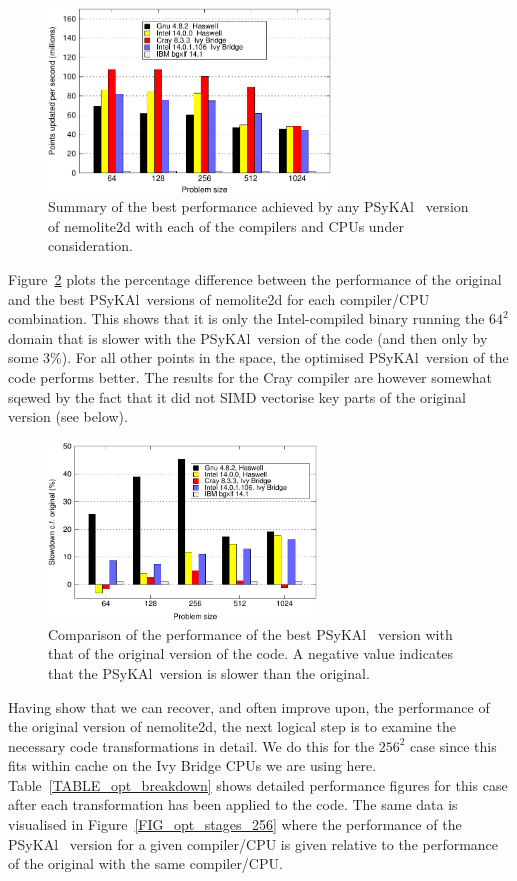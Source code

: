 \documentclass[journal]{IEEEtran}
\newcommand{\psykal}{{PS}y{KA}l\ }
\begin{document}
\begin{figure}[!t]
\centering
\includegraphics[width=7.5cm]{best_psykal_summary}
\caption{Summary of the best performance achieved by any \psykal 
version of nemolite2d with each of the compilers and CPUs under 
consideration.}
\label{FIG_best_psykal_perf_summary}
\end{figure}

Figure~\ref{FIG_slowdown_summary} plots the percentage difference
between the performance of the original and the best \psykal versions
of nemolite2d for each compiler/CPU combination. This shows that it is
only the Intel-compiled binary running the $64^2$ domain that is
slower with the \psykal version of the code (and then only by some
3\%). For all other points in the space, the optimised \psykal version
of the code performs better. The results for the Cray compiler are
however somewhat sqewed by the fact that it did not SIMD vectorise key
parts of the original version (see below).

\begin{figure}[!t]
\centering
\includegraphics[width=2.8in]{slowdown_summary}
\caption{Comparison of the performance of the best \psykal
version with that of the original version of the code. A negative value 
indicates that the \psykal version is slower than the original.}
\label{FIG_slowdown_summary}
\end{figure}

Having show that we can recover, and often improve upon, the
performance of the original version of nemolite2d, the next logical
step is to examine the necessary code transformations in detail.  We
do this for the $256^{2}$ case since this fits within cache on the Ivy
Bridge CPUs we are using here.  Table~\ref{TABLE_opt_breakdown} shows
detailed performance figures for this case after each transformation has been
applied to the code. The same data is visualised in
Figure~\ref{FIG_opt_stages_256} where the performance of the \psykal
version for a given compiler/CPU is given relative to the performance
of the original with the same compiler/CPU.
\end{document}
